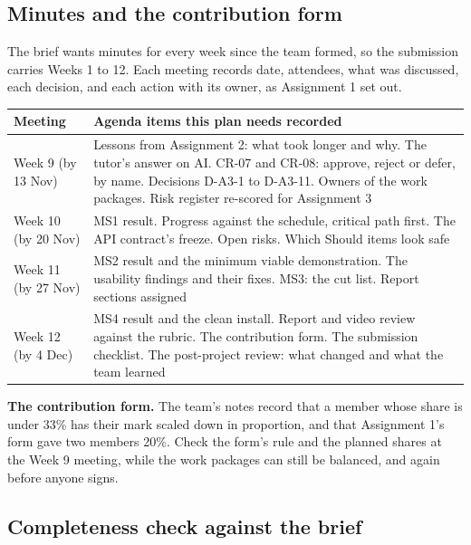 \subsection{Minutes and the contribution form}
\label{sec:minutes}

The brief wants minutes for every week since the team formed, so the submission carries Weeks 1 to
12. Each meeting records date, attendees, what was discussed, each decision, and each action with
its owner, as Assignment 1 set out.

\begin{center}
\small
\begin{tabularx}{\textwidth}{@{}L{2.6cm}Y@{}}
\toprule
\textbf{Meeting} & \textbf{Agenda items this plan needs recorded} \\
\midrule
Week 9 (by 13 Nov) & Lessons from Assignment 2: what took longer and why. The tutor's answer on AI. CR-07 and CR-08: approve, reject or defer, by name. Decisions D-A3-1 to D-A3-11. Owners of the work packages. Risk register re-scored for Assignment 3 \\
Week 10 (by 20 Nov) & MS1 result. Progress against the schedule, critical path first. The API contract's freeze. Open risks. Which Should items look safe \\
Week 11 (by 27 Nov) & MS2 result and the minimum viable demonstration. The usability findings and their fixes. MS3: the cut list. Report sections assigned \\
Week 12 (by 4 Dec) & MS4 result and the clean install. Report and video review against the rubric. The contribution form. The submission checklist. The post-project review: what changed and what the team learned \\
\bottomrule
\end{tabularx}
\end{center}

\begin{caution}
\textbf{The contribution form.} The team's notes record that a member whose share is under 33\%
has their mark scaled down in proportion, and that Assignment 1's form gave two members 20\%. Check the form's rule and the planned
shares at the Week 9 meeting, while the work packages can still be balanced, and again before
anyone signs.
\end{caution}

\subsection{Completeness check against the brief}

